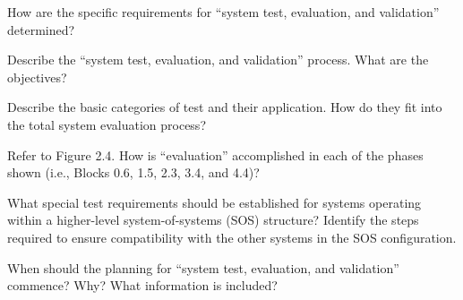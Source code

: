 \begin{exercises}
    \begin{exercise}
    \label{sea-6-1}
        How are the specific requirements for “system test, evaluation, and validation” determined?
    \end{exercise}
    \begin{solution}
    \end{solution}
    
    \begin{exercise}
    \label{sea-6-2}
        Describe the “system test, evaluation, and validation” process. What are the objectives?
    \end{exercise}
    \begin{solution}
    \end{solution}
    
    \begin{exercise}
    \label{sea-6-3}
        Describe the basic categories of test and their application. How do they fit into the total system evaluation process?
    \end{exercise}
    \begin{solution}
    \end{solution}
    
    \begin{exercise}
    \label{sea-6-4}
        Refer to Figure 2.4. How is “evaluation” accomplished in each of the phases shown (i.e., Blocks 0.6, 1.5, 2.3, 3.4, and 4.4)?
    \end{exercise}
    \begin{solution}
    \end{solution}
    
    \begin{exercise}
    \label{sea-6-5}
        What special test requirements should be established for systems operating within a higher-level system-of-systems (SOS) structure? Identify the steps required to ensure compatibility with the other systems in the SOS configuration. 
    \end{exercise}
    \begin{solution}
    \end{solution}
    
    \begin{exercise}
    \label{sea-6-6}
        When should the planning for “system test, evaluation, and validation” commence? Why? What information is included?
    \end{exercise}
    \begin{solution}
    \end{solution}
    

\end{exercises}

